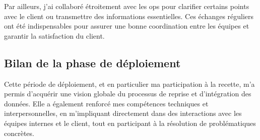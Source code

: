 Par ailleurs, j’ai collaboré étroitement avec les ops pour clarifier certains points avec le client ou transmettre des informations essentielles. Ces échanges réguliers ont été indispensables pour assurer une bonne coordination entre les équipes et garantir la satisfaction du client.

\subsection{Bilan de la phase de déploiement}

Cette période de déploiement, et en particulier ma participation à la recette, m’a permis d’acquérir une vision globale du processus de reprise et d’intégration des données. Elle a également renforcé mes compétences techniques et interpersonnelles, en m’impliquant directement dans des interactions avec les équipes internes et le client, tout en participant à la résolution de problématiques concrètes.




